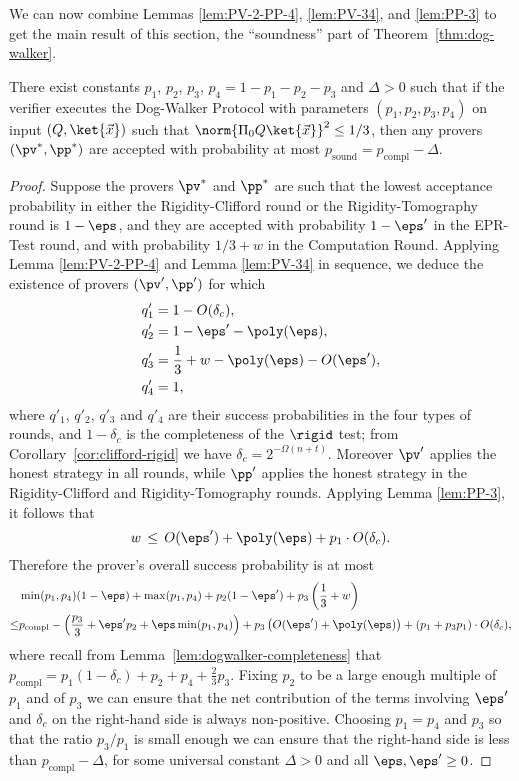 We can now combine Lemmas \ref{lem:PV-2-PP-4}, \ref{lem:PV-34}, and \ref{lem:PP-3} to get the main result of this section, the ``soundness'' part of Theorem~\ref{thm:dog-walker}.

\begin{lemma}\label{lem:dogwalker-soundness}
 There exist constants $p_1$, $p_2$, $p_3$, $p_4=1-p_1-p_2-p_3$ and $\Delta>0$ such that if the verifier executes the Dog-Walker Protocol with parameters $(p_1,p_2,p_3,p_4)$ on input $(Q,\ket{\vec{x}})$ such that $\norm{\Pi_0 Q\ket{\vec{x}}}^2\leq 1/3$, then any provers $(\pv^*,\pp^*)$ are accepted with probability at most $p_{\mathrm{sound}}=p_{\mathrm{compl}}-\Delta$. 
\end{lemma}

\begin{proof}
Suppose the provers $\pv^*$ and $\pp^*$ are such that the lowest acceptance probability in either the Rigidity-Clifford round or the Rigidity-Tomography round is $1- \eps$, and they are accepted with probability $1-\eps'$ in the EPR-Test round, and with probability $1/3+w$ in the Computation Round. Applying  Lemma \ref{lem:PV-2-PP-4} and Lemma \ref{lem:PV-34} in sequence, we deduce the existence of provers $(\pv',\pp')$ for which
\begin{align*}
q_1' &= 1- O(\delta_c), \\  q_2' &= 1-\eps'- \poly(\eps), \\ q_3' &= \frac13+w-
  \poly(\eps)-O(\eps'),\\ q_4' &= 1,
\end{align*}
where $q'_1$, $q'_2$, $q'_3$ and $q'_4$ are their success probabilities in the
  four types of rounds, and $1-\delta_c$ is the completeness of the
  $\rigid$ test; from Corollary~\ref{cor:clifford-rigid} we have $\delta_c = 2^{-\Omega(n+t)}$. Moreover $\pv'$ applies the honest strategy in all rounds, while $\pp'$ applies the honest strategy in the Rigidity-Clifford and Rigidity-Tomography rounds. Applying Lemma \ref{lem:PP-3}, it follows that 
$$w \,\leq\, O(\eps') + \poly(\eps) +p_1 \cdot O(\delta_c).$$
Therefore the prover's overall success probability is at most 
\begin{align*}
& \min(p_1,p_4)(1-\eps)+\max(p_1,p_4) + p_2(1-\eps')+p_3\left(\frac{1}{3}+w\right) \\
\leq & p_{\mathrm{compl}} - \left( \frac{p_3}{3} + \eps' p_2+\eps\min(p_1,p_4)\right)+ p_3\left(O(\eps')+\poly(\eps)\right)+ (p_1 + p_3p_1) \cdot O(\delta_c),
\end{align*}
where recall from Lemma~\ref{lem:dogwalker-completeness} that
  $p_{\mathrm{compl}} =  p_1(1-\delta_c)+p_2+p_4+\frac{2}{3}p_3$. Fixing $p_2$
  to be a large enough multiple of $p_1$ and of $p_3$ we can ensure that the net contribution
  of the terms involving $\eps'$ and $\delta_c$ on the right-hand side is always
  non-positive. Choosing $p_1=p_4$ and $p_3$ so that the ratio $p_3/p_1$ is small
  enough we can ensure that the right-hand side is less than $p_{\mathrm{compl}}
  -\Delta$, for some universal constant $\Delta>0$ and all $\eps,\eps'\geq 0$.
\end{proof}


